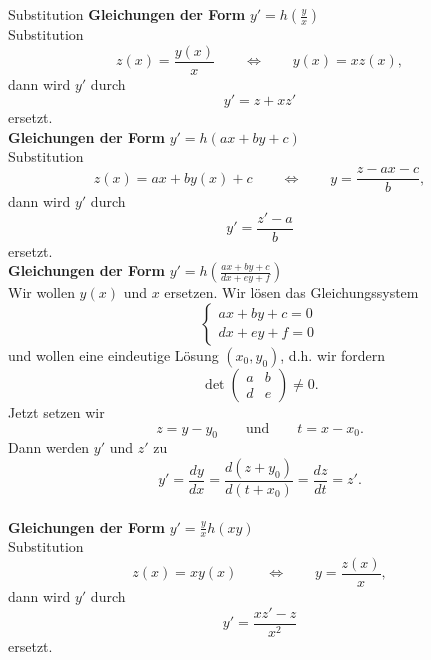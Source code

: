 \begin{Rezept}{Substitution}{}
	\textbf{Gleichungen der Form} $\boxed{y'=h\left(\frac{y}{x}\right)}$\\
	Substitution
	\begin{equation*}
	z(x)=\frac{y(x)}{x} \qquad \Leftrightarrow \qquad y(x)=x z(x),
	\end{equation*}
	dann wird $y'$ durch
	\begin{equation*}
	y'=z+xz'
	\end{equation*}
	ersetzt.\\
	
	\textbf{Gleichungen der Form} $\boxed{y'=h(ax+by+c)}$\\
	Substitution
	\begin{equation*}
	z(x)=ax+by(x)+c \qquad \Leftrightarrow \qquad y=\frac{z-ax-c}{b},
	\end{equation*}
	dann wird $y'$ durch
	\begin{equation*}
	y'=\frac{z'-a}{b}
	\end{equation*}
	ersetzt.\\
	
	\textbf{Gleichungen der Form} $\boxed{y'=h\left(\frac{ax + by + c}{dx + ey + f}\right)}$\\
	Wir wollen $y(x)$ und $x$ ersetzen. Wir lösen das Gleichungssystem
	\begin{equation*}
	\begin{cases}
	ax+by+c=0\\dx+ey+f=0
	\end{cases}
	\end{equation*}
	und wollen eine eindeutige Lösung $(x_0,y_0)$, d.h. wir fordern
	\begin{equation*}
	\det \begin{pmatrix}a &b \\d &e\end{pmatrix}\neq 0.
	\end{equation*}
	Jetzt setzen wir \begin{equation*}
	z=y-y_0 \qquad \text{und} \qquad t=x-x_0.
	\end{equation*}
	Dann werden $y'$ und $z'$ zu 
	\begin{equation*}
	y'=\frac{dy}{dx} = \frac{d(z+y_0)}{d(t+x_0)} = \frac{dz}{dt} = z'.
	\end{equation*}\\
	\textbf{Gleichungen der Form} $\boxed{y'=\frac{y}{x}h(xy)}$\\
	Substitution 
	\begin{equation*}
	z(x)=xy(x) \qquad \Leftrightarrow \qquad y=\frac{z(x)}{x},
	\end{equation*}
	dann wird $y'$ durch
	\begin{equation*}
	y'=\frac{xz'-z}{x^2}
	\end{equation*}
	ersetzt.\\
\end{Rezept}

